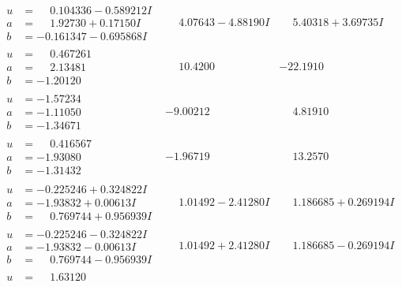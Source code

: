 \documentclass[1p]{elsarticle_modified}
\theoremstyle{definition}
\begin{document}
$$\begin{array}{c|c|c}
\begin{aligned}
u &= \phantom{-}0.104336 - 0.589212 I \\
a &= \phantom{-}1.92730 + 0.17150 I \\
b &= -0.161347 - 0.695868 I\end{aligned}
 & \phantom{-}4.07643 - 4.88190 I & \phantom{-}5.40318 + 3.69735 I \\ \hline\begin{aligned}
u &= \phantom{-}0.467261\phantom{ +0.000000I} \\
a &= \phantom{-}2.13481\phantom{ +0.000000I} \\
b &= -1.20120\phantom{ +0.000000I}\end{aligned}
 & \phantom{-}10.4200\phantom{ +0.000000I} & -22.1910\phantom{ +0.000000I} \\ \hline\begin{aligned}
u &= -1.57234\phantom{ +0.000000I} \\
a &= -1.11050\phantom{ +0.000000I} \\
b &= -1.34671\phantom{ +0.000000I}\end{aligned}
 & -9.00212\phantom{ +0.000000I} & \phantom{-}4.81910\phantom{ +0.000000I} \\ \hline\begin{aligned}
u &= \phantom{-}0.416567\phantom{ +0.000000I} \\
a &= -1.93080\phantom{ +0.000000I} \\
b &= -1.31432\phantom{ +0.000000I}\end{aligned}
 & -1.96719\phantom{ +0.000000I} & \phantom{-}13.2570\phantom{ +0.000000I} \\ \hline\begin{aligned}
u &= -0.225246 + 0.324822 I \\
a &= -1.93832 + 0.00613 I \\
b &= \phantom{-}0.769744 + 0.956939 I\end{aligned}
 & \phantom{-}1.01492 - 2.41280 I & \phantom{-}1.186685 + 0.269194 I \\ \hline\begin{aligned}
u &= -0.225246 - 0.324822 I \\
a &= -1.93832 - 0.00613 I \\
b &= \phantom{-}0.769744 - 0.956939 I\end{aligned}
 & \phantom{-}1.01492 + 2.41280 I & \phantom{-}1.186685 - 0.269194 I \\ \hline\begin{aligned}
u &= \phantom{-}1.63120\phantom{ +0.000000I} \\

\end{aligned}
\end{array}$$
\end{document}
